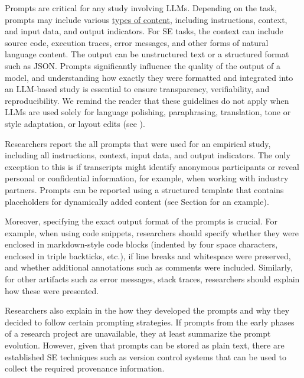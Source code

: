 Prompts are critical for any study involving LLMs.
Depending on the task, prompts may include various \href{https://www.promptingguide.ai/introduction/elements}{types of content}, including instructions, context, and input data, and output indicators.
For SE tasks, the context can include source code, execution traces, error messages, and other forms of natural language content.
The output can be unstructured text or a structured format such as JSON.
Prompts significantly influence the quality of the output of a model, and understanding how exactly they were formatted and integrated into an LLM-based study is essential to ensure transparency, verifiability, and reproducibility.
We remind the reader that these guidelines do not apply when LLMs are used solely for language polishing, paraphrasing, translation, tone or style adaptation, or layout edits (see \scope).


Researchers \must report the all prompts that were used for an empirical study, including all instructions, context, input data, and output indicators.
The only exception to this is if transcripts might identify anonymous participants or reveal personal or confidential information, for example, when working with industry partners.
Prompts can be reported using a structured template that contains placeholders for dynamically added content (see Section \judges for an example).

Moreover, specifying the exact output format of the prompts is crucial.
For example, when using code snippets, researchers should specify whether they were enclosed in markdown-style code blocks (indented by four space characters, enclosed in triple backticks, etc.), if line breaks and whitespace were preserved, and whether additional annotations such as comments were included.
Similarly, for other artifacts such as error messages, stack traces, researchers should explain how these were presented.

Researchers \must also explain in the \paper how they developed the prompts and why they decided to follow certain prompting strategies.
If prompts from the early phases of a research project are unavailable, they \must at least summarize the prompt evolution.
However, given that prompts can be stored as plain text, there are established SE techniques such as version control systems that can be used to collect the required provenance information.

